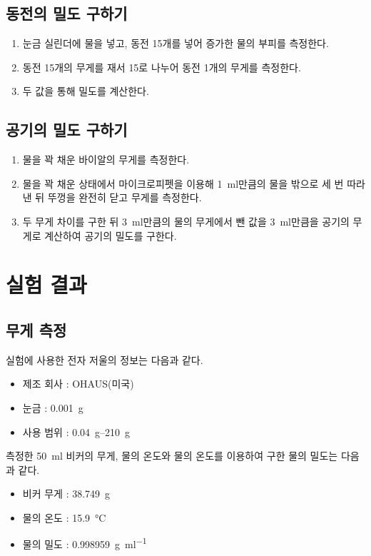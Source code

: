 \documentclass{GSHS-chemexp}
\begin{document}
	\subsection{동전의 밀도 구하기}
	\begin{enumerate}
		\item 눈금 실린더에 물을 넣고, 동전 \unit{15}{개}를 넣어
		증가한 물의 부피를 측정한다.
		\item 동전 \unit{15}{개}의 무게를 재서 15로 나누어
		동전 \unit{1}{개}의 무게를 측정한다.
		\item 두 값을 통해 밀도를 계산한다.
	\end{enumerate}
	
	\subsection{공기의 밀도 구하기}
	\begin{enumerate}
		\item 물을 꽉 채운 바이알의 무게를 측정한다.
		\item 물을 꽉 채운 상태에서 마이크로피펫을 이용해
		\SI{1}{\milli\litre}만큼의 물을 밖으로 세 번 따라낸 뒤
		뚜껑을 완전히 닫고 무게를 측정한다.
		\item 두 무게 차이를 구한 뒤 \SI{3}{\milli\litre}만큼의 물의 
		무게에서 뺀 값을 \SI{3}{\milli\litre}만큼을 공기의 무게로 
		계산하여 공기의 밀도를 구한다.
	\end{enumerate}
	
	\section{실험 결과}
	
	\subsection{무게 측정}
	실험에 사용한 전자 저울의 정보는 다음과 같다.
	\begin{itemize}
		\item 제조 회사 : OHAUS(미국)
		\item 눈금 : \SI{0.001}{\gram}
		\item 사용 범위 : \SIrange{0.04}{210}{\gram}
	\end{itemize}
	
	측정한 \SI{50}{\milli\litre} 비커의 무게, 물의 온도와
	물의 온도를 이용하여 구한 물의 밀도는 다음과 같다.
	\begin{itemize}
		\item 비커 무게 : \SI{38.749}{\gram}
		\item 물의 온도 : \SI{15.9}{\degreeCelsius}
		\item 물의 밀도 : \SI{0.998959}{\gram\per\milli\litre} 
		\cite{Santa_Cruz}
	\end{itemize}
\end{document}
